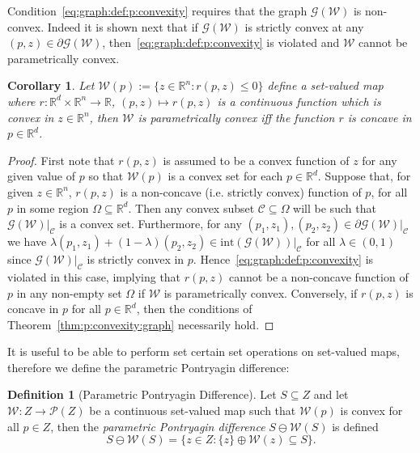 \documentclass[final]{elsarticle}
\newcounter{thmcount}
\newtheorem{cor}[thmcount]{Corollary}
\theoremstyle{remark}
\theoremstyle{definition}
\newtheorem{defi}[thmcount]{Definition}
\begin{document}
Condition~\eqref{eq:graph:def:p:convexity} requires that the graph $\mathscr G(\mathcal W)$ is non-convex.
%
Indeed it is shown next that if $\mathscr G(\mathcal W)$ is strictly convex at any $(p,z)\in\partial \mathscr G (\mathcal W)$, then~\eqref{eq:graph:def:p:convexity} is violated and 
$\mathcal W$ cannot be parametrically convex.

%
\begin{cor}\label{thm:inequalities:convex:concave}
%
Let $\mathcal W(p):=\{z\in\mathbb R^n: r(p,z)\leq0\}$ define a set-valued
map where 
$r: \mathbb R^d \times\mathbb R^n \rightarrow \mathbb R$, $(p,z)\mapsto r(p,z)$ is a continuous function which is convex in $z \in\mathbb R^n$, 
then $\mathcal W$ is parametrically
convex iff the function $r$ is concave in $p\in\mathbb R^d$.
%
\end{cor}
%
\begin{proof}
First note that $r(p,z)$ is assumed to be a convex function of $z$ for any given value of $p$ so that $\mathcal W(p)$ is a convex set for each $p\in\mathbb R^d$.
%
Suppose that, for given $z\in\mathbb R^n$, $r(p,z)$ is a non-concave (i.e. 
strictly convex) function of $p$, for all $p$ in some region $\Omega\subseteq\mathbb R^d$. 
%
Then any convex subset $\mathcal C\subseteq\Omega$ will be such that $\mathscr 
G(\mathcal W)\vert_{\mathcal C}$ is a convex set.
%
Furthermore, for any $(p_1,z_1),(p_2,z_2)\in \partial\mathscr G(\mathcal W)\vert_{\mathcal C}$ we have
$\lambda (p_1,z_1) + (1-\lambda) (p_2,z_2) \in\mathrm{int} (\mathscr G(\mathcal W))\vert_{\mathcal C}$ for all $\lambda\in(0,1)$ since
$\mathscr G(\mathcal W)\vert_{\mathcal C}$ is strictly convex in $p$.
%
Hence~\eqref{eq:graph:def:p:convexity} is violated in this case, implying that $r(p,z)$ cannot be a non-concave function of $p$ in any non-empty set $\Omega$ if $\mathcal W$ is parametrically convex. 
%
Conversely, if $r(p,z)$ is concave in $p$ for all $p\in\mathbb R^d$, then the conditions of Theorem~\ref{thm:p:convexity:graph} necessarily hold.
\end{proof}
%
It is useful to be able to perform set certain set operations on set-valued maps, therefore we define the parametric Pontryagin difference:
%
\begin{defi}[Parametric Pontryagin Difference]\label{def:parametric:pontryagin:difference}
  Let $S\subseteq Z$ and let $\mathcal W:Z\to\mathscr P(Z)$ be a continuous set-valued map such that
  $\mathcal W(p)$ is convex for all $p\in Z$, then the \emph{parametric Pontryagin difference} 
  $S\ominus \mathcal W(S)$ is defined
%
\begin{equation}\label{eq:definition:parametric:pontryagin:difference}
    S\ominus \mathcal W(S) = \bigl\{z\in Z: \{z\} \oplus \mathcal W(z)\subseteq S\bigr\}.
  \end{equation}
%
\end{defi}
\end{document}
